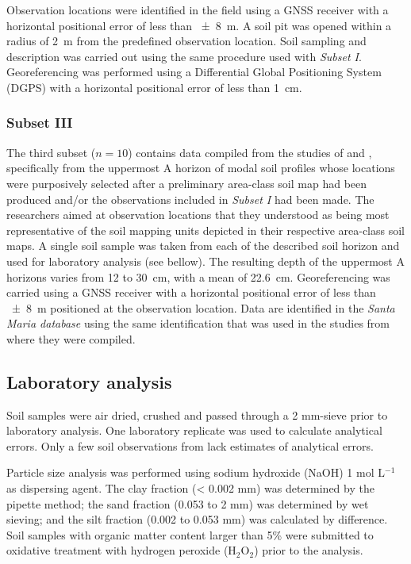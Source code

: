 Observation locations were identified in the field using a GNSS receiver with a horizontal positional error
of less than \SI{\pm8}{\metre}. A soil pit was opened within a radius of \SI{2}{\metre} from the predefined 
observation location. Soil sampling and description was carried out using the same procedure used with 
\emph{Subset I}. Georeferencing was performed using a Differential Global Positioning System (DGPS) with 
a horizontal positional error of less than \SI{1}{\centi\metre}.

\tocless\subsubsection{Subset III}

The third subset ($n = 10$) contains data compiled from the studies of  and
, specifically from the uppermost A horizon of modal soil profiles whose locations 
were purposively selected after a preliminary area-class soil map had been produced and/or the observations
included in \emph{Subset I} had been made. The researchers aimed at observation locations that they 
understood as being most representative of the soil mapping units depicted in their respective area-class 
soil maps. A single soil sample was taken from each of the described soil horizon and used for laboratory 
analysis (see bellow). The resulting depth of the uppermost A horizons varies from \num{12} to 
\SI{30}{\centi\metre}, with a mean of \SI{22.6}{\centi\metre}. Georeferencing was carried using a GNSS 
receiver with a horizontal positional error of less than \SI{\pm8}{\metre} positioned at the observation 
location. Data are identified in the \emph{Santa Maria database} using the same identification that was 
used in the studies from where they were compiled.




\tocless\subsection{Laboratory analysis}

Soil samples were air dried, crushed and passed through a 2 mm-sieve prior to laboratory analysis. One laboratory replicate was used to calculate analytical errors. Only a few soil observations from \cite{Pedron2005, MiguelEtAl2012} lack estimates of analytical errors.

Particle size analysis was performed using sodium hydroxide (NaOH) 1 mol $\text{L}{}^{-1}$ as dispersing agent. The clay fraction (< 0.002 mm) was determined by the pipette method; the sand fraction (0.053 to 2 mm) was determined by wet sieving; and the silt fraction (0.002 to 0.053 mm) was calculated by difference. Soil samples with organic matter content larger than 5\% were submitted to oxidative treatment with hydrogen peroxide ($\text{H}_{2}\text{O}_{2}$) prior to the analysis.

